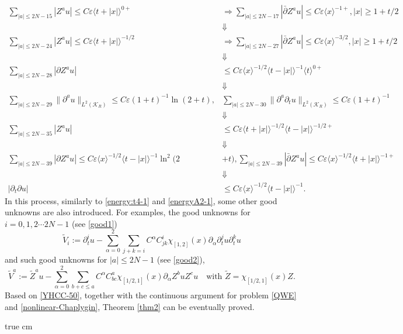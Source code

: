 \documentclass[11pt,twoside]{article}
\def\cK{\mathcal K}
\def\p{\partial}
\def\ve{\varepsilon}
\newcommand{\w}[1]{\langle {#1} \rangle}
\theoremstyle{plain}
\theoremstyle{definition}
\numberwithin{equation}{section}
\begin{document}
\begin{equation}\label{YHCC-50}
\begin{split}
\sum_{|a|\le2N-15}|Z^au|\le C\ve\w{t+|x|}^{0+} & \Rightarrow \sum_{|a|\le2N-17}|\bar\p Z^au|\le C\ve\w{x}^{-1+},|x|\ge1+t/2 \\
& \Downarrow \\
\sum_{|a|\le2N-24}|Z^au|\le C\ve\w{t+|x|}^{-1/2} & \Rightarrow \sum_{|a|\le2N-27}|\bar\p Z^au|\le C\ve\w{x}^{-3/2},|x|\ge1+t/2 \\
& \Downarrow \\
\sum_{|a|\le2N-28}|\p Z^au|&\le C\ve\w{x}^{-1/2}\w{t-|x|}^{-1}\w{t}^{0+}\\
& \Downarrow \\
\sum_{|a|\le2N-29}\|\p^au\|_{L^2(\cK_R)}\le C\ve(1+t)^{-1}\ln(2+t), &\sum_{|a|\le2N-30}\|\p^a\p_tu\|_{L^2(\cK_R)}\le C\ve(1+t)^{-1} \\
& \Downarrow \\
\sum_{|a|\le2N-35}|Z^au|&\le C\ve\w{t+|x|}^{-1/2}\w{t-|x|}^{-1/2+}\\
& \Downarrow \\
\sum_{|a|\le2N-39}|\p Z^au|\le C\ve\w{x}^{-1/2}\w{t-|x|}^{-1}\ln^2(2&+t),
\sum_{|a|\le2N-39}|\bar\p Z^au|\le C\ve\w{x}^{-1/2}\w{t+|x|}^{-1+}\\
& \Downarrow \\
|\p_t\p u|&\le C\ve\w{x}^{-1/2}\w{t-|x|}^{-1}.
\end{split}
\end{equation}
In this process, similarly to \eqref{energy:t4-1} and \eqref{energyA2-1}, some other good unknowns are also introduced.
For examples, the good unknowns for $i=0,1,2\cdots2N-1$ (see \eqref{good1})
\begin{equation*}\label{good1-1}
\tilde V_i:=\p_t^iu-\sum_{\alpha=0}^2\sum_{j+k=i}C^{\alpha}C^i_{jk}\chi_{[1,2]}(x)\p_{\alpha}\p_t^ju\p_t^ku
\end{equation*}
and such good unknowns for $|a|\le2N-1$ (see \eqref{good2}),
\begin{equation*}\label{good2-1}
\tilde V^a:=\tilde Z^au-\sum_{\alpha=0}^2\sum_{b+c\le a}C^{\alpha}C^a_{bc}\chi_{[1/2,1]}(x)\p_{\alpha}Z^buZ^cu\quad
\text{with $\tilde Z=\chi_{[1/2,1]}(x)Z$}.
\end{equation*}
Based on \eqref{YHCC-50}, together with the continuous argument for problem \eqref{QWE} and \eqref{nonlinear-Chaplygin},
Theorem \ref{thm2} can be eventually proved.

 true cm
\end{document}
